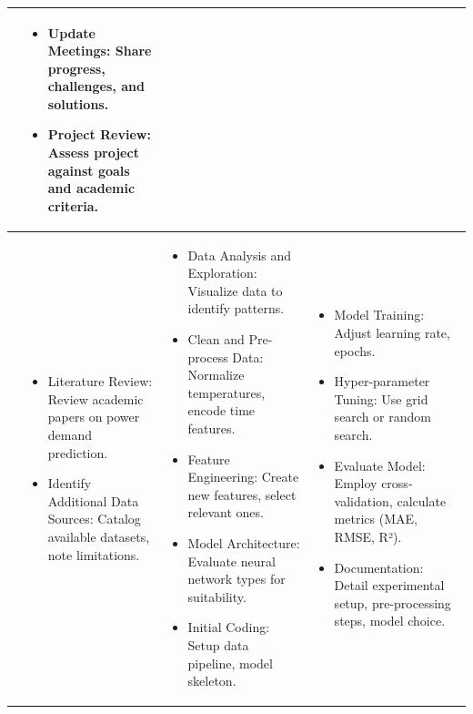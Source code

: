 \documentclass[mstat,12pt]{unswthesis}
\begin{document}
\begin{landscape}
\begin{tabularx}{\linewidth}{@{} M{0.5cm} Y Y Y @{}}
\begin{itemize}[leftmargin=*, nosep, after=\vspace{-1.5ex}, before=\vspace{-2.5ex}]
\end{itemize} &
\begin{itemize}[leftmargin=*, nosep, after=\vspace{-1.5ex}, before=\vspace{-2.5ex}]
    \item Update Meetings: Share progress, challenges, and solutions.
    \item Project Review: Assess project against goals and academic criteria.
\end{itemize} \\
\midrule
{} & 
\begin{itemize}[leftmargin=*, nosep, after=\vspace{-1.5ex}, before=\vspace{-2.5ex}]
    \item Literature Review: Review academic papers on power demand prediction.
    \item Identify Additional Data Sources: Catalog available datasets, note limitations.
\end{itemize} &
\begin{itemize}[leftmargin=*, nosep, after=\vspace{-1.5ex}, before=\vspace{-2.5ex}]
    \item Data Analysis and Exploration: Visualize data to identify patterns.
    \item Clean and Pre-process Data: Normalize temperatures, encode time features.
    \item Feature Engineering: Create new features, select relevant ones.
    \item Model Architecture: Evaluate neural network types for suitability.
    \item Initial Coding: Setup data pipeline, model skeleton.
\end{itemize} &
\begin{itemize}[leftmargin=*, nosep, after=\vspace{-1.5ex}, before=\vspace{-2.5ex}]
    \item Model Training: Adjust learning rate, epochs.
    \item Hyper-parameter Tuning: Use grid search or random search.
    \item Evaluate Model: Employ cross-validation, calculate metrics (MAE, RMSE, R²).
    \item Documentation: Detail experimental setup, pre-processing steps, model choice.

\end{itemize}
\end{tabularx}
\end{landscape}
\end{document}
